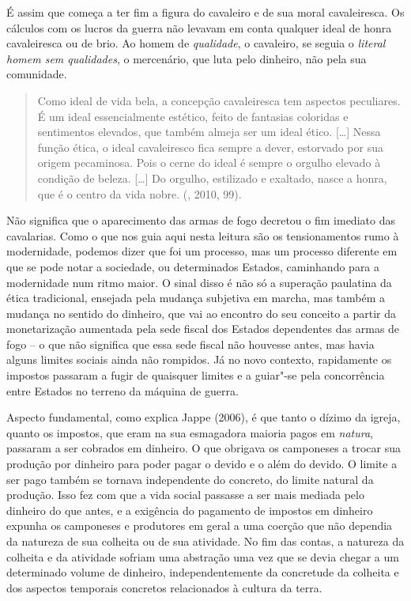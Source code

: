 É assim que começa a ter fim a figura do cavaleiro e de sua moral
cavaleiresca. Os cálculos com os lucros da guerra não levavam em conta
qualquer ideal de honra cavaleiresca ou de brio. Ao homem de
\emph{qualidade}, o cavaleiro, se seguia o \emph{literal homem sem
qualidades}, o mercenário, que luta pelo dinheiro, não pela sua
comunidade.

\begin{quote}
Como ideal de vida bela, a concepção cavaleiresca tem aspectos
peculiares. É um ideal essencialmente estético, feito de fantasias
coloridas e sentimentos elevados, que também almeja ser um ideal ético.
[\ldots{}] Nessa função ética, o ideal cavaleiresco fica sempre a
dever, estorvado por sua origem pecaminosa. Pois o cerne do ideal é
sempre o orgulho elevado à condição de beleza. [\ldots{}] Do
orgulho, estilizado e exaltado, nasce a honra, que é o centro da vida
nobre. (, 2010, 99).
\end{quote}

Não significa que o aparecimento das armas de fogo decretou o fim
imediato das cavalarias. Como o que nos guia aqui nesta leitura são os tensionamentos
rumo à modernidade, podemos dizer que foi um processo, mas um processo
diferente em que se pode notar a sociedade, ou determinados Estados,
caminhando para a modernidade num ritmo maior. O sinal disso é não só a
superação paulatina da ética tradicional, ensejada pela mudança
subjetiva em marcha, mas também a mudança no sentido do dinheiro, que
vai ao encontro do seu conceito a partir da monetarização aumentada pela
sede fiscal dos Estados dependentes das armas de fogo -- o que não
significa que essa sede fiscal não houvesse antes, mas havia alguns
limites sociais ainda não rompidos. Já no novo contexto, rapidamente os
impostos passaram a fugir de quaisquer limites e a guiar"-se pela
concorrência entre Estados no terreno da máquina de guerra.

Aspecto fundamental, como explica Jappe (2006), é que tanto o dízimo da
igreja, quanto os impostos, que eram na sua esmagadora maioria pagos em
\emph{natura}, passaram a ser cobrados em dinheiro. O que obrigava os
camponeses a trocar sua produção por dinheiro para poder pagar o devido
e o além do devido. O limite a ser pago também se tornava independente
do concreto, do limite natural da produção. Isso fez com que a vida
social passasse a ser mais mediada pelo dinheiro do que antes, e a
exigência do pagamento de impostos em dinheiro expunha os camponeses e
produtores em geral a uma coerção que não dependia da natureza de sua
colheita ou de sua atividade. No fim das contas, a natureza da colheita
e da atividade sofriam uma abstração uma vez que se devia chegar a um
determinado volume de dinheiro, independentemente da concretude da
colheita e dos aspectos temporais concretos relacionados à cultura da
terra.

